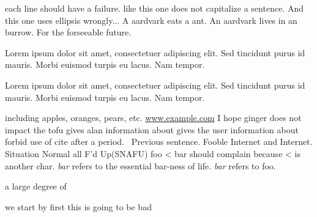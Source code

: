 each line should have a failure.  like this one does not capitalize a sentence.
And this one uses ellipsis wrongly...
A aardvark eats a ant.
An aardvark lives in an burrow.
For the forseeable future.
\caption{Lorem ipsum dolor sit amet, consectetuer adipiscing elit. Sed tincidunt purus id mauris. Morbi euismod turpis eu lacus. Nam tempor.}
\caption{\label{thelabel}Lorem ipsum dolor sit amet, consectetuer adipiscing elit. Sed tincidunt purus id mauris. Morbi euismod turpis eu lacus. Nam tempor.}
including apples, oranges, pears, etc.
\url{www.example.com}
I hope ginger does not impact the tofu
gives alan information about
gives the user information about
forbid use of cite after a period.~\cite{foo}
Previous sentence.  Fooble Internet and Internet.
Situation Normal all F'd Up(SNAFU)
foo < bar should complain because < is another char.
\emph{bar} refers to the essential bar-ness of life.
\emph{bar} refers to foo.

a large degree of 
      
	




we start by first
this is going to be bad